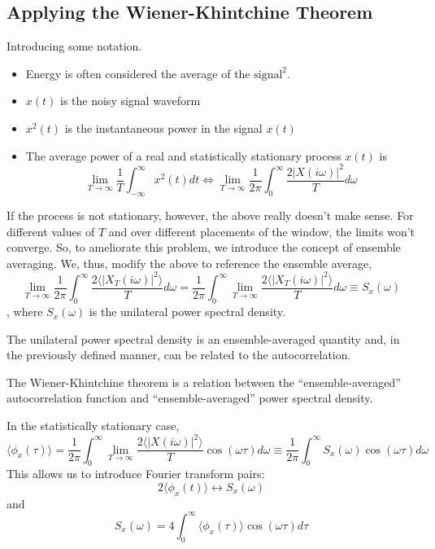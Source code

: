 \documentclass{article}
\begin{document}
\subsection{Applying the Wiener-Khintchine Theorem}
Introducing some notation.
\begin{itemize}
   \item Energy is often considered the average of the $ \textrm{signal}^2 $.
   \item $ x(t) $ is the noisy signal waveform
   \item $ x^{2}(t) $ is the instantaneous power in the signal $ x(t) $
   \item The average power of a real and statistically stationary process $ x(t) $ is
      \[
         \lim_{T \to \infty} \frac{1}{T} \int_{-\infty}^{\infty} x^{2}(t) dt
         \Leftrightarrow
         \lim_{T\rightarrow \infty} \frac{1}{2\pi} \int_{0}^{\infty} \frac{2
         |X(i\omega)|^2}{T}d\omega
      \]
\end{itemize}
If the process is not stationary, however, the above really doesn't make sense.
For different values of $T$ and over different placements of the window, the
limits won't converge. So, to ameliorate this problem, we introduce the concept
of ensemble averaging. We, thus, modify the above to reference the ensemble
average,
\[
   \lim_{T \to \infty} \frac{1}{2\pi} \int_{0}^{\infty} \frac{2 \langle|
   X_{T}(i\omega)|^2\rangle}{T} d\omega =
   \frac{1}{2\pi} \int_{0}^{\infty} \lim_{T \to \infty} \frac{2 \langle |
   X_{T}(i\omega)|^2 \rangle}{T}d\omega \equiv S_{x}(\omega)
\]
, where $ S_{x}(\omega) $ is the unilateral power spectral density.

The unilateral power spectral density is an ensemble-averaged quantity and, in
the previously defined manner, can be related to the autocorrelation.

The Wiener-Khintchine theorem is a relation between the ``ensemble-averaged''
autocorrelation function and ``ensemble-averaged'' power spectral density.

In the statistically stationary case,
\[
   \langle \phi_{x}(\tau) \rangle = \frac{1}{2\pi}\int_{0}^{\infty} \lim_{T\to \infty}
   \frac{ 2\langle
   |X(i\omega)|^2\rangle}{T}\cos(\omega \tau) d\omega
   \equiv
   \frac{1}{2\pi} \int_{0}^{\infty}S_{x}(\omega) \cos(\omega \tau) d\omega
\]
This allows us to introduce Fourier transform pairs:
\[
   2 \langle \phi_{x}(t) \rangle \leftrightarrow S_{x}(\omega)
\]
and
\[
   S_{x}(\omega) = 4 \int_{0}^{\infty} \langle \phi_{x}(\tau) \rangle
   \cos(\omega \tau) d\tau
\]
\end{document}
